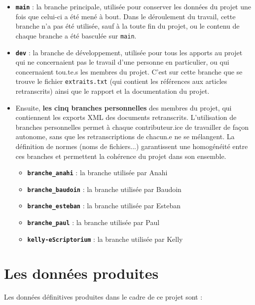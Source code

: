 \documentclass{article}
\begin{document}
	\begin{itemize}
		\item \textbf{\texttt{main}} : la branche principale, utilisée pour conserver les données du projet une fois que celui-ci a été mené à bout. Dans le déroulement du travail, cette branche n'a pas été utilisée, sauf à la toute fin du projet, ou le contenu de chaque branche a été basculée sur \texttt{main}.
		\item \textbf{\texttt{dev}} : la branche de développement, utilisée pour tous les apports au projet qui ne concernaient pas le travail d'une personne en particulier, ou qui concernaient tou.te.s les membres du projet. C'est sur cette branche que se trouve le fichier \texttt{extraits.txt} (qui contient les références aux articles retranscrits) ainsi que le rapport et la documentation du projet.
		\item Ensuite, \textbf{les cinq branches personnelles} des membres du projet, qui contiennent les exports XML des documents retranscrits. L'utilisation de branches personnelles permet à chaque contributeur.ice de travailler de façon autonome, sans que les retranscriptions de chacun.e ne se mélangent. La définition de normes (noms de fichiers...) garantissent une homogénéité entre ces branches et permettent la cohérence du projet dans son ensemble.
		\begin{itemize}
			\item \textbf{\texttt{branche\_anahi}} : la branche utilisée par Anahi
			\item \textbf{\texttt{branche\_baudoin}} : la branche utilisée par Baudoin
			\item \textbf{\texttt{branche\_esteban}} : la branche utilisée par Esteban
			\item \textbf{\texttt{branche\_paul}} : la branche utilisée par Paul
			\item \textbf{\texttt{kelly-eScriptorium}} : la branche utilisée par Kelly
		\end{itemize}
	\end{itemize}
	
	
	\section{Les données produites}
	Les données définitives produites dans le cadre de ce projet sont :
	
\end{document}
